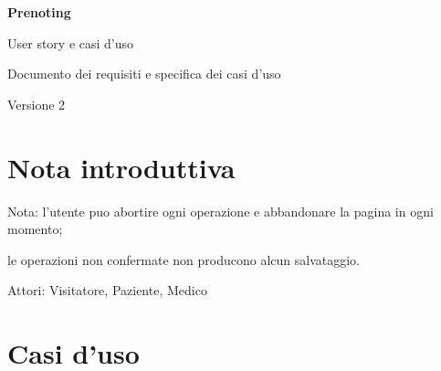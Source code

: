 \documentclass[11pt,a4paper]{article}
\newcommand{\RequirementParagraph}[1]{\par\noindent #1\par}
\begin{document}
\begin{titlepage}
    \centering
    \vspace*{2.5cm}
    {\Huge\bfseries Prenoting\par}
    \vspace{0.45cm}
    {\LARGE User story e casi d'uso\par}
    \vspace{1.2cm}
    {\Large Documento dei requisiti e specifica dei casi d'uso\par}
    \vfill
    {\large Versione 2\par}
\end{titlepage}

\tableofcontents
\newpage

\section*{Nota introduttiva}
\begin{RequirementBlock}
\RequirementParagraph{Nota: l'utente puo abortire ogni operazione e abbandonare la pagina in ogni momento;}

\RequirementParagraph{le operazioni non confermate non producono alcun salvataggio.}

\RequirementParagraph{Attori: Visitatore, Paziente, Medico}
\end{RequirementBlock}

\section{Casi d'uso}
\end{document}
